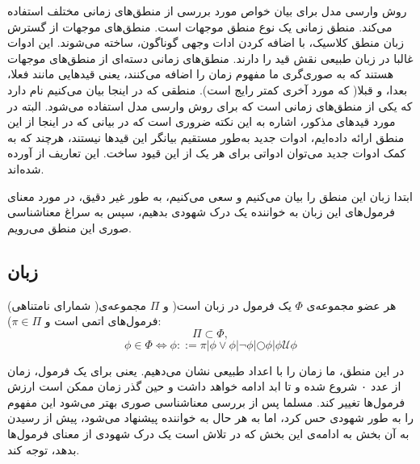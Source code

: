 روش وارسی مدل برای بیان خواص مورد بررسی از منطق‌های زمانی مختلف استفاده می‌کند. منطق زمانی یک نوع منطق موجهات است. منطق‌های موجهات از گسترش زبان منطق کلاسیک، با اضافه کردن ادات وجهی گوناگون، ساخته می‌شوند. این ادوات غالبا در زبان طبیعی نقش قید را دارند. منطق‌های زمانی دسته‌ای از منطق‌های موجهات هستند که به صوری‌گری ما مفهوم زمان را اضافه می‌کنند، یعنی قیدهایی مانند فعلا، بعدا، و قبلا( که مورد آخری کمتر رایج است). منطقی که در اینجا بیان می‌کنیم  نام دارد که یکی از منطق‌های زمانی است که برای روش وارسی مدل استفاده می‌شود. البته در مورد قیدهای مذکور، اشاره به این نکته ضروری است که در بیانی که در اینجا از این منطق ارائه داده‌ایم، ادوات جدید به‌طور مستقیم بیانگر این قید‌ها نیستند، هرچند که به کمک ادوات جدید می‌توان ادواتی برای هر یک از این قیود ساخت.
این تعاریف از \cite{buchi} آورده شده‌اند.

ابتدا زبان این منطق را بیان می‌کنیم و سعی می‌کنیم، به طور غیر دقیق، در مورد معنای فرمول‌های این زبان به خواننده یک درک شهودی بدهیم، سپس به سراغ معناشناسی صوری این منطق می‌رویم.

\subsection{زبان }
\begin{defn}
	هر عضو مجموعه‌ی $\Phi$ یک فرمول در زبان  است( و $\Pi$ مجموعه‌ی‌( شمارای نامتناهی) فرمول‌های اتمی است و $\pi \in \Pi$):
	$$
	\Pi \subset \Phi,
	$$
	$$
	\phi \in \Phi \Leftrightarrow
	\phi ::= \pi | \phi \lor \phi |
	\neg \phi |
	\bigcirc \phi |
	\phi \mathcal{U}\phi 
$$	
	
\end{defn}
در این منطق، ما زمان را با اعداد طبیعی نشان می‌دهیم. یعنی برای یک فرمول، زمان از عدد ۰ شروع شده و تا ابد ادامه خواهد داشت و حین گذر زمان ممکن است ارزش فرمول‌ها تغییر کند. مسلما پس از بررسی معناشناسی صوری بهتر می‌شود این مفهوم را به طور شهودی حس کرد، اما به هر حال به خواننده پیشنهاد می‌شود، پیش از رسیدن به آن بخش به ادامه‌ی این بخش که در تلاش است یک درک شهودی از معنای فرمول‌ها بدهد، توجه کند. 

